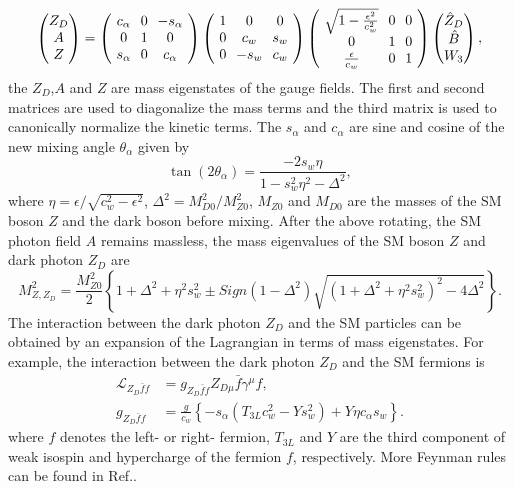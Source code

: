 \documentclass{article}
\begin{document}
\begin{equation}
\setlength{\arraycolsep}{3.5pt}
 \begin{pmatrix}
  Z_D\\A\\Z
  \end{pmatrix}
=\left(
	\begin{array}{ccc}
      c_{\alpha} & 0 & -s_{\alpha}\\
	  0 & 1 & 0 \\
	  s_{\alpha} & 0 & c_{\alpha}	
	\end{array}
\right)
\left(
	\begin{array}{ccc}
	1 & 0 & 0\\
 	0 & c_w & s_w \\
 	0 & -s_w & c_w
	\end{array}
\right)
\left(
	\begin{array}{ccc}
	\sqrt{1-\frac{\epsilon^2}{c_w^2}} & 0 & 0 \\
 0 & 1 & 0 \\
 \frac{\epsilon}{c_w} & 0 & 1	
	\end{array}
\right)
\begin{pmatrix}
  \hat{Z}_D\\\hat{B}\\W_3
  \end{pmatrix},
\end{equation}
the $Z_D$,$A$ and $Z$ are mass eigenstates of the gauge fields.
The first and second matrices are used to diagonalize the mass terms and the third matrix is used to canonically normalize the kinetic terms. The $s_{\alpha}$ and $c_{\alpha}$ are sine and cosine of the new mixing angle $\theta_\alpha$ given by
 \begin{equation}
 \tan\left(2\theta_\alpha\right)=\frac{-2s_w\eta}{1-s_w^2\eta^2-\Delta^2},
 \end{equation}
 where  $\eta=\epsilon/\sqrt{c_w^2-\epsilon^2}$, $\Delta^2=M_{D0}^2/M_{Z0}^{2}$,  $M_{Z0}$ and $M_{D0}$ are the masses of the SM boson $Z$  and the dark boson before mixing. After the above rotating, the SM photon field $A$ remains massless, the mass eigenvalues of the SM boson $Z$  and dark photon $Z_D$ are  
\begin{equation}
M_{Z,Z_D}^2=\frac{M_{Z0}^2}{2}\left\{1+\Delta^2+\eta^2 s_w^2\pm Sign(1-\Delta^2)\sqrt{(1+\Delta^2+\eta^2s_w^2)^2-4\Delta^2}\right\}
.
\end{equation}
The interaction between the dark photon  $Z_D$  and the SM particles can be obtained by an expansion of the Lagrangian in terms of mass eigenstates. For example, the interaction between the dark photon  $Z_D$  and the SM fermions is
 \begin{align}
\mathcal{L}_{Z_D\bar{f}f}&=g_{Z_D\bar{f}f}Z_{D\mu}\bar{f} \gamma^\mu f,
\\
g_{Z_D\bar{f}f}&= \frac{g}{c_w}\left\{-s_{\alpha} (T_{3L} c_w^2-Ys_w^2)+Y\eta c_{\alpha} s_w \right\}.
\end{align}
where $f$ denotes the left- or right- fermion, $T_{3L}$ and $Y$ are the third component of weak isospin and hypercharge of the fermion $f$, respectively.
More Feynman rules can be found in Ref.\cite{0801.3456}.
 
\end{document}
